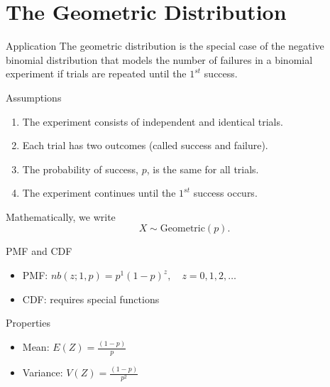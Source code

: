 \section{The Geometric Distribution}

\begin{frame}
  \begin{block}{Application}
    The geometric distribution is the special case of the negative binomial distribution that models the number of failures in a binomial experiment if trials are repeated until the $1^{st}$ success.
  \end{block}

  \begin{block}{Assumptions}
    \begin{enumerate}
    \item The experiment consists of independent and identical trials.
    \item Each trial has two outcomes (called success and failure).
    \item The probability of success, $p$, is the same for all trials.
    \item The experiment continues until the $1^{st}$ success occurs.
    \end{enumerate}
  \end{block}

  \bigskip

  Mathematically, we write
  \[
    X \sim \mbox{Geometric}(p).
  \]
\end{frame}

\begin{frame}
  \begin{block}{PMF and CDF}
    \begin{itemize}
    \item PMF: $nb(z;1,p)=p^{1}(1-p)^z, \quad z=0,1,2,\ldots$
    \item CDF: requires special functions
    \end{itemize}
  \end{block}

  \begin{block}{Properties}
    \begin{itemize}
    \item Mean: $E(Z)=\frac{(1-p)}{p}$
      
    \item Variance: $V(Z)=\frac{(1-p)}{p^2}$
      
    \end{itemize}
  \end{block}
\end{frame}

